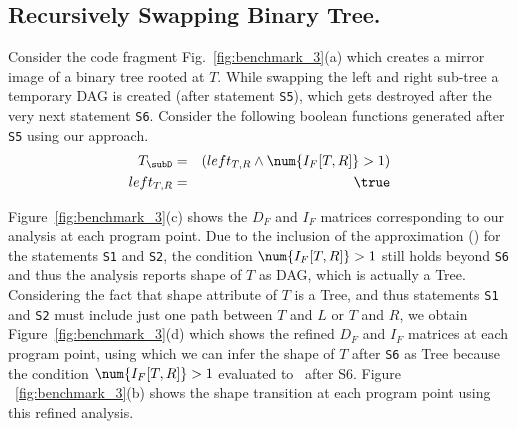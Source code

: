 \subsection{Recursively Swapping Binary Tree.}
Consider the code fragment Fig.~\ref{fig:benchmark_3}(a)
which creates a mirror image of a binary tree rooted at
$T$. While swapping the left and right sub-tree a temporary
DAG is created (after statement {\tt S5}), which gets
destroyed after the very next statement {\tt S6}.
Consider the following boolean functions generated after {\tt
  S5} using our approach.
\begin{eqnarray*}
  T_{\subD} &=&   (left_{T,R} \wedge \num{I_F[T,R]} > 1) \\ 
  left_{T,R} &=& \true 
\end{eqnarray*}

Figure~\ref{fig:benchmark_3}(c) shows the $D_F$ and $I_F$ matrices
corresponding to our analysis at each program point. Due to
the inclusion of the approximation (\upath) for the statements
{\tt S1} and {\tt S2}, the condition $\num{I_F[T,R]} > 1$  still holds 
beyond {\tt S6} and thus the analysis reports shape of $T$ as DAG, which is actually a Tree. 
Considering the fact that shape attribute of
$T$ is a Tree, and thus statements {\tt S1} and {\tt S2} must include
just one path between $T$ and $L$ or $T$ and $R$, we obtain
Figure~\ref{fig:benchmark_3}(d) which shows the  refined $D_F$ and $I_F$ matrices at each program
point, using which we can infer the shape of $T$ after {\tt S6} as Tree because the condition $\num{I_F[T,R]} > 1$ 
evaluated to \false\ after {S6}. Figure ~\ref{fig:benchmark_3}(b) shows the shape transition at each program 
point using this refined analysis.


